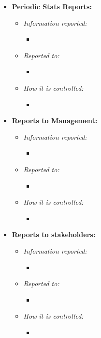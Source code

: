 \documentclass[letterpaper,12pt,oneside,listof=totoc]{scrreprt}
\begin{document}
\begin{itemize}
    \item \textbf{Periodic Stats Reports:}
    \begin{itemize}
        \item \textit{Information reported:}
        \begin{itemize}
            \item 
        \end{itemize}
        \item \textit{Reported to:}
        \begin{itemize}
            \item 
        \end{itemize}
        \item \textit{How it is controlled:}
        \begin{itemize}
            \item 
        \end{itemize}
    \end{itemize}
    \item \textbf{Reports to Management:}
    \begin{itemize}
        \item \textit{Information reported:}
        \begin{itemize}
            \item 
        \end{itemize}
        \item \textit{Reported to:}
        \begin{itemize}
            \item 
        \end{itemize}
        \item \textit{How it is controlled:}
        \begin{itemize}
            \item 
        \end{itemize}
    \end{itemize}
    \item \textbf{Reports to stakeholders:}
    \begin{itemize}
        \item \textit{Information reported:}
        \begin{itemize}
            \item 
        \end{itemize}
        \item \textit{Reported to:}
        \begin{itemize}
            \item 
        \end{itemize}
        \item \textit{How it is controlled:}
        \begin{itemize}
            \item 
        \end{itemize}
    \end{itemize}
\end{itemize}
\end{document}
